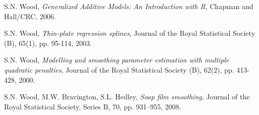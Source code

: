 \documentclass[a4paper,11pt,twoside,openright]{book}							%
\begin{document}
\begin{thebibliography}{99}
S.N. Wood, \emph{Generalized Additive Models: An Introduction with R}, Chapman and Hall/CRC, 2006.

S.N. Wood, \emph{Thin-plate regression splines}, Journal of the Royal Statistical Society (B), 65(1), pp. 95-114, 2003.
  
S.N. Wood, \emph{Modelling and smoothing parameter estimation with multiple quadratic penalties}, Journal of the Royal Statistical Society (B), 62(2), pp. 413-428, 2000.

S.N. Wood, M.W. Bravington, S.L. Hedley, \emph{Soap film smoothing}, Journal of the Royal Statistical Society, Series B, 70, pp. 931–955, 2008.


\end{thebibliography}
\end{document}
